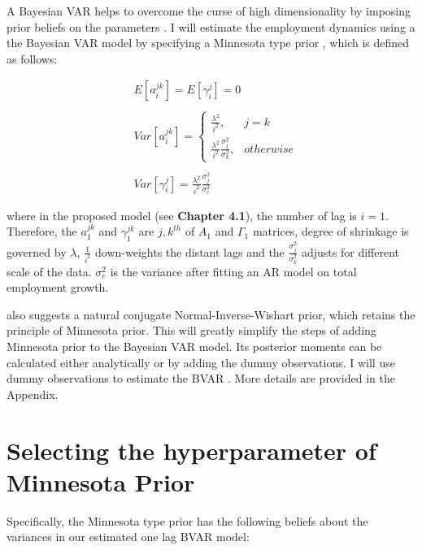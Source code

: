\documentclass{monashthesis}
\begin{document}
A Bayesian VAR helps to overcome the curse of high dimensionality by imposing prior beliefs on the parameters \autocite{banbura2010large}. I will estimate the employment dynamics using a the Bayesian VAR model by specifying a Minnesota type prior \autocites[e.g.][]{anderson2020,litterman1986,robertson1999vector}, which is defined as follows:

\[
\begin{aligned}\label{eq:1}
&E[a_{i}^{jk}] = E[\gamma_{i}^j]=0\\
\\
&Var[a_i^{jk}]= 
\begin{cases}
\frac{\lambda^2}{i^2},&j=k\\
\frac{\lambda^2}{i^2}\frac{\sigma^2_{j}}{\sigma^2_k},& otherwise
\end{cases}\\
\\
&Var[\gamma_i^{j}]=\frac{\lambda^2}{i^2}\frac{\sigma^2_{j}}{\sigma^2_e}
\end{aligned}
\]

where in the proposed model (see \textbf{Chapter 4.1}), the number of lag is \(i=1\). Therefore, the \(a_{1}^{jk}\) and \(\gamma_{1}^{jk}\) are \({j,k}^{th}\) of \(A_1\) and \(\Gamma_1\) matrices, degree of shrinkage is governed by \(\lambda\), \(\frac{1}{i^2}\) down-weights the distant lags and the \(\frac{\sigma_j^2}{\sigma_k^2}\) adjusts for different scale of the data. \(\sigma^2_e\) is the variance after fitting an AR model on total employment growth.

\textcite{banbura2010large} also suggests a natural conjugate Normal-Inverse-Wishart prior, which retains the principle of Minnesota prior. This will greatly simplify the steps of adding Minnesota prior to the Bayesian VAR model. Its posterior moments can be calculated either analytically or by adding the dummy observations. I will use dummy observations to estimate the BVAR \autocite{banbura2010large}. More details are provided in the Appendix.

\hypertarget{selecting-the-hyperparameter-of-minnesota-prior}{%
\section{Selecting the hyperparameter of Minnesota Prior}\label{selecting-the-hyperparameter-of-minnesota-prior}}

Specifically, the Minnesota type prior has the following beliefs about the variances in our estimated one lag BVAR model:
\end{document}
